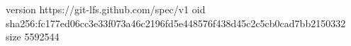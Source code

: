 version https://git-lfs.github.com/spec/v1
oid sha256:fc177ed06cc3e33f073a46c2196fd5e448576f438d45c2c5cb0cad7bb2150332
size 5592544
